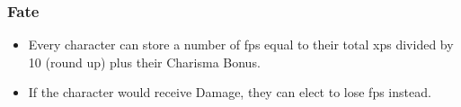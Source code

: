 \subsubsection*{Fate}
\begin{itemize}
  \item
  Every character can store a number of \glspl{fp} equal to their total \glspl{xp} divided by 10 (round up) plus their Charisma Bonus.
  \item
  If the character would receive Damage, they can elect to lose \glspl{fp} instead.
\end{itemize}
